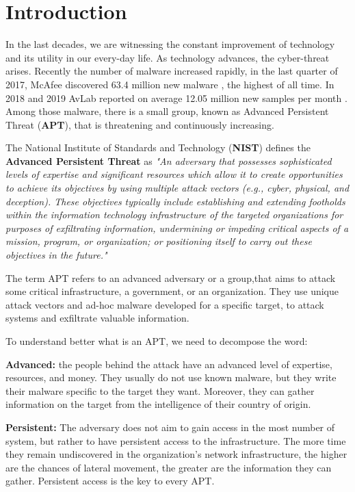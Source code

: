 \chapter{Introduction}

In the last decades, we are witnessing the constant improvement of technology and its utility in our every-day life. As technology advances, the cyber-threat arises.
Recently the number of malware increased rapidly, in the last quarter of 2017, McAfee discovered 63.4 million new malware \cite{mcafee2018}, the highest of all time. In 2018 and 2019 AvLab reported on average 12.05 million new samples per month \cite{avtest2020}. Among those malware, there is a small group, known as Advanced Persistent Threat (\textbf{APT}), that is threatening and continuously increasing. 

The National Institute of Standards and Technology (\textbf{NIST}) defines the \textbf{Advanced Persistent Threat} as \cite{nistapt} \textit{"An adversary that possesses sophisticated levels of expertise and significant resources which allow it to create opportunities to achieve its objectives by using multiple attack vectors (e.g., cyber, physical, and deception). These objectives typically include establishing and extending footholds within the information technology infrastructure of the targeted organizations for purposes of exfiltrating information, undermining or impeding critical aspects of a mission, program, or organization; or positioning itself to carry out these objectives in the future."}

The term APT refers to an advanced adversary or a group,that aims to attack some critical infrastructure, a government, or an organization. They use unique attack vectors and ad-hoc malware developed for a specific target, to attack systems and exfiltrate valuable information.

To understand better what is an APT, we need to decompose the word: \cite{apt_def}

\textbf{Advanced:} the people behind the attack have an advanced level of expertise, resources, and money. They usually do not use known malware, but they write their malware specific to the target they want. Moreover, they can gather information on the target from the intelligence of their country of origin.

\textbf{Persistent:}  The adversary does not aim to gain access in the most number of system, but rather to have persistent access to the infrastructure. The more time they remain undiscovered in the organization's network infrastructure, the higher are the chances of lateral movement, the greater are the information they can gather. Persistent access is the key to every APT.

